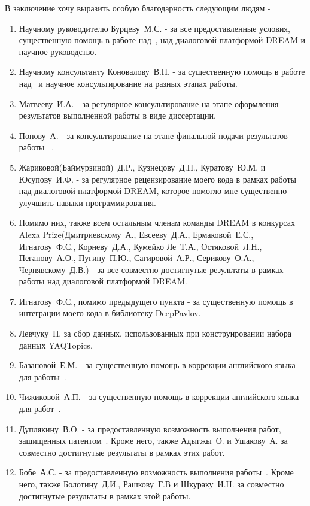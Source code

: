 В заключение хочу выразить особую благодарность следующим людям - 
\begin{enumerate}
\item Научному руководителю Бурцеву~М.\:С. - за все предоставленные условия, существенную помощь в работе над~\cite{dream1,dream1_trudy,dream2,pseudolabel}, над диалоговой платформой DREAM и научное руководство.
\item Научному консультанту Коновалову~В.\:П. - за существенную помощь в работе над~\cite{rumtl,rutopics,enmtl,dp_2023} и научное консультирование на разных этапах работы.
\item Матвееву~И.\:А. - за регулярное консультирование на этапе оформления результатов выполненной работы в виде диссертации.
\item Попову~А. - за консультирование на этапе финальной подачи результатов работы ~\cite{rutopics}.
\item Жариковой(Баймурзиной)~Д.\:Р., Кузнецову~Д.\:П., Куратову~Ю.\:М. и Юсупову~И.\:Ф. - за регулярное рецензирование моего кода в рамках работы над диалоговой платформой DREAM, которое помогло мне существенно улучшить навыки программирования. 
\item Помимо них, также всем остальным членам команды DREAM в конкурсах Alexa Prize(Дмитриевскому~А., Евсееву~Д.\:А., Ермаковой~Е.\:С., Игнатову~Ф.\:С., Корневу~Д.\:А., Кумейко Ле~Т.\:А., Остяковой~Л.\:Н., Пеганову~А.\:О., Пугину~П.\:Ю., Сагировой~А.\:Р., Серикову~О.\:А., Чернявскому~Д.\:В.) - за все совместно достигнутые результаты в рамках работы над диалоговой платформой DREAM. 
\item Игнатову~Ф.\:С., помимо предыдущего пункта - за существенную помощь в интеграции моего кода в библиотеку DeepPavlov.
\item Левчуку~П. за сбор данных, использованных при конструировании набора данных YAQTopics.
\item Базановой~Е.\:М. - за существенную помощь в коррекции английского языка для работы~\cite{enmtl}.
\item Чижиковой~А.\:П. - за существенную помощь в коррекции английского языка для работ~\cite{rumtl,rutopics}.
\item Дуплякину~В.\:О. - за предоставленную возможность выполнения работ, защищенных патентом~\cite{Дуплякин_Дмитрий_Ондар_Ушаков_2021}. Кроме него, также Адыгжы~\:О. и Ушакову~\:А. за совместно достигнутые результаты в рамках этих работ. 
\item Бобе~А.\:С. - за предоставленную возможность выполнения работы~\cite{Болотин_Карпов_Рашков_Шкурак_2019}. Кроме него, также Болотину~Д.\:И., Рашкову~Г.\:В и Шкураку~И.\:Н. за совместно достигнутые результаты в рамках этой работы. 

\end{enumerate}
